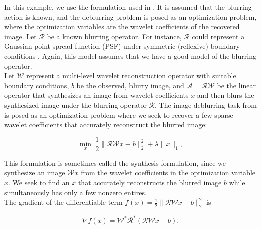 \documentclass[journal]{IEEEtran}
\begin{document}
In this example, we use the formulation used in \cite{beck_2009}.  It is assumed that the blurring action is known, and the deblurring problem is posed as an optimization problem, where the optimization variables are the wavelet coefficients of the recovered image.  Let $\mathcal{R}$ be a known blurring operator.  For instance, $\mathcal{R}$ could represent a Gaussian point spread function (PSF) under symmetric (reflexive) boundary conditions \cite{hansen_2006}.  Again, this model assumes that we have a good model of the blurring operator.\\

Let $\mathcal{W}$ represent a multi-level wavelet reconstruction operator with suitable boundary conditions, $b$ be the observed, blurry image, and $\mathcal{A}=\mathcal{RW}$ be the linear operator that synthesizes an image from wavelet coefficients $x$ and then blurs the synthesized image under the blurring operator $\mathcal{R}$.  The image deblurring task from \cite{beck_2009} is posed as an optimization problem where we seek to recover a few sparse wavelet coefficients that accurately reconstruct the blurred image:

\begin{equation}
\label{eq:syn_problem}
\min_x~ \dfrac{1}{2}\|\mathcal{RW}x-b\|_2^2 + \lambda \|x\|_1,
\end{equation}

\noindent This formulation is sometimes called the synthesis formulation, since we synthesize an image $\mathcal{W}x$ from the wavelet coefficients in the optimization variable $x$.  We seek to find an $x$ that accurately reconstructs the blurred image $b$ while simultaneously has only a few nonzero entires.\\

The gradient of the differentiable term $f(x)={\frac{1}{2}\|\mathcal{RW}x-b\|_2^2}$ is

\[ \nabla f(x) = \mathcal{W}^\ast \mathcal{R}^\ast(\mathcal{RW}x-b). \] 
\end{document}
